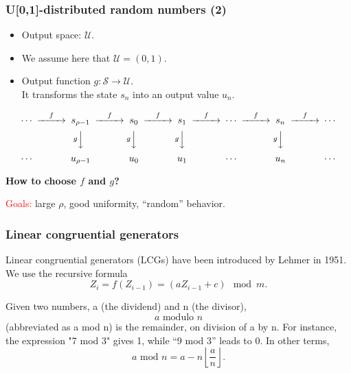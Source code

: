 \documentclass{beamer}
\begin{document}
	\begin{frame}
		\frametitle{U[0,1]-distributed random numbers (2)}
		
		\begin{itemize}
			\item
			Output space: $\mathcal{U}$.
			\item
			We assume here that $\mathcal{U} = (0,1)$.
			\item
			Output function $g: \mathcal{S} \rightarrow \mathcal{U}$.\\
			It transforms the state $s_n$ into an output value $u_n$.
		\end{itemize}
		
		\begin{small}
			\[
			\begin{CD}
				\cdots @>f>> s_{\rho-1} @>f>> s_0 @>f>> s_1  @>f>> 
				\cdots @>f>> s_n @>f>> \cdots \\ 
				@. @V{g}VV  @V{g}VV   @V{g}VV   
				@.  @V{g}VV  \\
				\cdots @. u_{\rho-1} @. u_0
				@.  u_1  @.   \cdots @.  u_n @.  \cdots \\
			\end{CD}
			\]
			\label{fig:rng}
		\end{small}
		
		\mbox{}
		
		{\bf How to choose $f$ and $g$?}
		
		\mbox{}
		
		\textcolor{red}{Goals:} large $\rho$, good uniformity, ``random'' behavior.
		
	\end{frame}
	
	\begin{frame}
		\frametitle{Linear congruential generators}
		
		{\red Linear congruential generators} (LCGs) have been introduced by
		Lehmer in 1951.
		We use the recursive formula
		\[
		Z_i = f(Z_{i-1}) = (aZ_{i-1}+c) \mod m.
		\]
		
		Given two numbers, a (the dividend) and n (the divisor),
		\[
		a \mbox{ modulo }n
		\]
		(abbreviated as a mod n) is the remainder, on division of a by n. For
		instance, the expression "7 mod 3" gives 1, while ``9 mod 3'' leads to 0.
		In other terms,
		\[
		a \mbox{ mod } n = a - n\left\lfloor \frac{a}{n} \right\rfloor.
		\]
		
	\end{frame}
	
\end{document}
